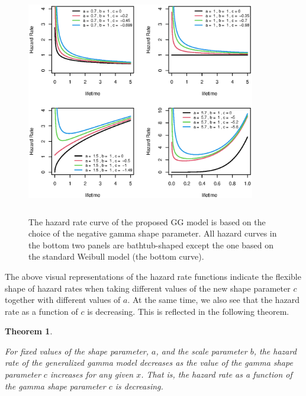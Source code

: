 \documentclass{ps}
\theoremstyle{plain}%
\newtheorem{theorem}{Theorem}[section]
\theoremstyle{definition}
\theoremstyle{remark}
\begin{document}
\begin{figure}[h]
	\centering	\includegraphics[width=10cm,height=10cm]{Figure05_neg_c_hr.eps}
	\caption{The hazard rate curve of the proposed GG model is based on the choice of the negative gamma shape parameter. All hazard curves in the bottom two panels are bathtub-shaped except the one based on the standard Weibull model (the bottom curve).}
	\label{Figure05_neg_c_hr}
\end{figure}

The above visual representations of the hazard rate functions indicate the flexible shape of hazard rates when taking different values of the new shape parameter $c$ together with different values of $a$. At the same time, we also see that the hazard rate as a function of $c$ is decreasing. This is reflected in the following theorem.


\begin{theorem}\label{thm4.1}
	
	For fixed values of the shape parameter, $a$, and the scale parameter $b$, the hazard rate of the generalized gamma model decreases as the value of the gamma shape parameter $c$ increases for any given $x$. That is, the hazard rate as a function of the gamma shape parameter $c$ is decreasing.	
	
\end{theorem}
\end{document}
